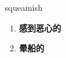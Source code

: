 
\begin{frame}
{\huge squeamish}
\begin{center}
\begin{enumerate}\Large
  \item \textbf{感到恶心的}
  \item \textbf{晕船的}
\end{enumerate}
\end{center}
\end{frame}
